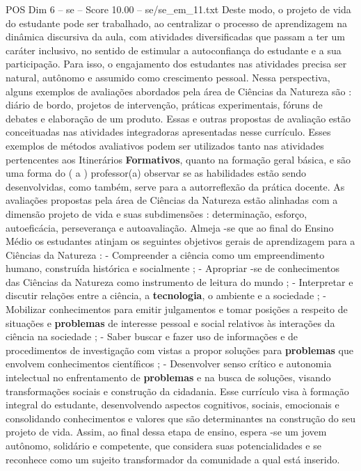 \begin{textsample}{POS Dim 6 – se – Score 10.00 – se/se\_em\_11.txt}
Deste modo, o projeto de vida do estudante pode ser trabalhado, ao centralizar o processo de aprendizagem na dinâmica discursiva da aula, com atividades diversificadas que passam a ter um caráter inclusivo, no sentido de estimular a autoconfiança do estudante e a sua participação.
Para isso, o engajamento dos estudantes nas atividades precisa ser natural, autônomo e assumido como crescimento pessoal.
Nessa perspectiva, alguns exemplos de avaliações abordados pela área de Ciências da Natureza são : diário de bordo, projetos de intervenção, práticas experimentais, fóruns de debates e elaboração de um produto.
Essas e outras propostas de avaliação estão conceituadas nas atividades integradoras apresentadas nesse currículo.
Esses exemplos de métodos avaliativos podem ser utilizados tanto nas atividades pertencentes aos Itinerários \textbf{Formativos}, quanto na formação geral básica, e são uma forma do ( a ) professor(a) observar se as habilidades estão sendo desenvolvidas, como também, serve para a autorreflexão da prática docente.
As avaliações propostas pela área de Ciências da Natureza estão alinhadas com a dimensão projeto de vida e suas subdimensões : determinação, esforço, autoeficácia, perseverança e autoavaliação.
Almeja -se que ao final do Ensino Médio os estudantes atinjam os seguintes objetivos gerais de aprendizagem para a Ciências da Natureza : - Compreender a ciência como um empreendimento humano, construída histórica e socialmente ; - Apropriar -se de conhecimentos das Ciências da Natureza como instrumento de leitura do mundo ; - Interpretar e discutir relações entre a ciência, a \textbf{tecnologia}, o ambiente e a sociedade ; - Mobilizar conhecimentos para emitir julgamentos e tomar posições a respeito de situações e \textbf{problemas} de interesse pessoal e social relativos às interações da ciência na sociedade ; - Saber buscar e fazer uso de informações e de procedimentos de investigação com vistas a propor soluções para \textbf{problemas} que envolvem conhecimentos científicos ; - Desenvolver senso crítico e autonomia intelectual no enfrentamento de \textbf{problemas} e na busca de soluções, visando transformações sociais e construção da cidadania.
Esse currículo visa à formação integral do estudante, desenvolvendo aspectos cognitivos, sociais, emocionais e consolidando conhecimentos e valores que são determinantes na construção do seu projeto de vida.
Assim, ao final dessa etapa de ensino, espera -se um jovem autônomo, solidário e competente, que considera suas potencialidades e se reconhece como um sujeito transformador da comunidade a qual está inserido.

\end{textsample}
